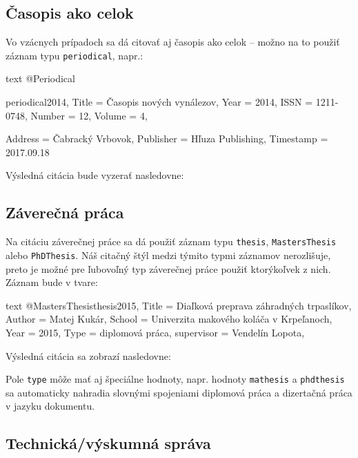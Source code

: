 \noindent[X] 

\subsection{Časopis ako celok}

Vo vzácnych prípadoch sa dá citovať aj časopis ako celok -- možno na to použiť záznam typu \texttt{periodical}, napr.:
\begin{inlinecode}[breaklines]{text}
@Periodical{periodical2014,
  Title                    = {Časopis nových vynálezov},
  Year                     = {2014},
  ISSN                     = {1211-0748},
  Number                   = {12},
  Volume                   = {4},

  Address                  = {Čabracký Vrbovok},
  Publisher                = {Hľuza Publishing},
  Timestamp                = {2017.09.18}
}
\end{inlinecode}
Výsledná citácia bude vyzerať nasledovne:

\noindent[X] 

\subsection{Záverečná práca}

Na citáciu záverečnej práce sa dá použiť záznam typu \texttt{thesis}, \texttt{MastersThesis} alebo \texttt{PhDThesis}. Náš citačný štýl medzi týmito typmi záznamov nerozlišuje, preto je možné pre ľubovoľný typ záverečnej práce použiť ktorýkoľvek z nich. Záznam bude v tvare:
\begin{inlinecode}[breaklines]{text}
@MastersThesis{thesis2015,
  Title                    = {Diaľková preprava záhradných trpaslíkov},
  Author                   = {Matej Kukár},
  School                   = {Univerzita makového koláča v Krpeľanoch},
  Year                     = {2015},
  Type                     = {diplomová práca},
  supervisor               = {Vendelín Lopota},
}
\end{inlinecode}

Výsledná citácia sa zobrazí nasledovne:

\noindent[X] 

Pole \texttt{type} môže mať aj špeciálne hodnoty, napr. hodnoty \texttt{mathesis} a \texttt{phdthesis} sa automaticky nahradia slovnými spojeniami diplomová práca a dizertačná práca v jazyku dokumentu.

\subsection{Technická/výskumná správa}

